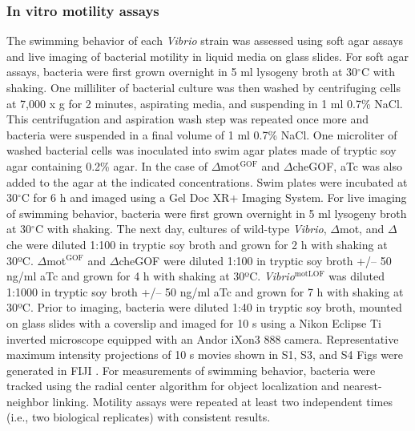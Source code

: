 {{{{{{{\subsubsection{In vitro motility assays}
The swimming behavior of each \textit{Vibrio} strain was assessed using soft agar assays and live imaging of bacterial motility in liquid media on glass slides. For soft agar assays, bacteria were first grown overnight in 5 ml lysogeny broth at 30$^\circ$C with shaking. One milliliter of bacterial culture was then washed by centrifuging cells at 7,000 x g for 2 minutes, aspirating media, and suspending in 1 ml 0.7\% NaCl. This centrifugation and aspiration wash step was repeated once more and bacteria were suspended in a final volume of 1 ml 0.7\% NaCl. One microliter of washed bacterial cells was inoculated into swim agar plates made of tryptic soy agar containing 0.2\% agar. In the case of $\Delta$mot$^{\text{GOF}}$ and $\Delta$cheGOF, aTc was also added to the agar at the indicated concentrations. Swim plates were incubated at 30$^\circ$C for 6 h and imaged using a Gel Doc XR+ Imaging System. For live imaging of swimming behavior, bacteria were first grown overnight in 5 ml lysogeny broth at 30$^\circ$C with shaking. The next day, cultures of wild-type \textit{Vibrio}, $\Delta$mot, and $\Delta$che were diluted 1:100 in tryptic soy broth and grown for 2 h with shaking at 30ºC. $\Delta$mot$^{\text{GOF}}$ and $\Delta$cheGOF were diluted 1:100 in tryptic soy broth +/– 50 ng/ml aTc and grown for 4 h with shaking at 30ºC. \textit{Vibrio}$^{\text{motLOF}}$ was diluted 1:1000 in tryptic soy broth +/– 50 ng/ml aTc and grown for 7 h with shaking at 30ºC. Prior to imaging, bacteria were diluted 1:40 in tryptic soy broth, mounted on glass slides with a coverslip and imaged for 10 s using a Nikon Eclipse Ti inverted microscope equipped with an Andor iXon3 888 camera. Representative maximum intensity projections of 10 s movies shown in S1, S3, and S4 Figs were generated in FIJI \cite{schindelin_fiji_2012}. For measurements of swimming behavior, bacteria were tracked using the radial center algorithm \cite{parthasarathy_rapid_2012} for object localization and nearest-neighbor linking. Motility assays were repeated at least two independent times (i.e., two biological replicates) with consistent results. 

}}}}}}}
